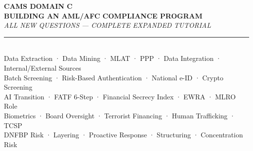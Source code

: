 \documentclass[12pt,aspectratio=169]{beamer}
\begin{document}
	
	\begin{frame}
		\centering
		\vspace{0.3cm}
		{\fontsize{18}{22}\selectfont \textbf{CAMS DOMAIN C}}\\[0.1cm]
		{\fontsize{14}{17}\selectfont \textbf{BUILDING AN AML/AFC COMPLIANCE PROGRAM}}\\[0.15cm]
		{\fontsize{9}{11}\selectfont \textit{ALL NEW QUESTIONS — COMPLETE EXPANDED TUTORIAL}}\\[0.08cm]
		\rule{4cm}{0.5pt}\\[0.08cm]
		{\fontsize{6}{7}\selectfont Data Extraction · Data Mining · MLAT · PPP · Data Integration · Internal/External Sources}\\[0.04cm]
		{\fontsize{6}{7}\selectfont Batch Screening · Risk-Based Authentication · National e-ID · Crypto Screening}\\[0.04cm]
		{\fontsize{6}{7}\selectfont AI Transition · FATF 6-Step · Financial Secrecy Index · EWRA · MLRO Role}\\[0.04cm]
		{\fontsize{6}{7}\selectfont Biometrics · Board Oversight · Terrorist Financing · Human Trafficking · TCSP}\\[0.04cm]
		{\fontsize{6}{7}\selectfont DNFBP Risk · Layering · Proactive Response · Structuring · Concentration Risk}
		\vspace{0.2cm}
	\end{frame}
	
\end{document}
